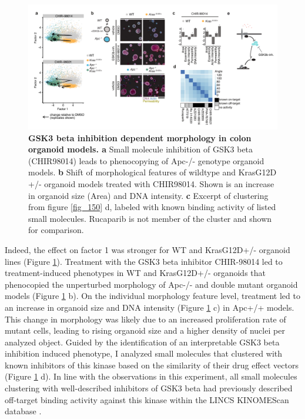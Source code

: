 \begin{flushleft}
\begin{figure}[h]
\centering
\includegraphics[scale=0.75,
                keepaspectratio]{figures/adenomaprofiling/pdf/fig_2_4_1.pdf}
\caption[GSK3 beta inhibition dependent morphology in colon organoid models]{\textbf{GSK3 beta inhibition dependent morphology in colon organoid models. a} Small molecule inhibition of GSK3 beta (CHIR98014) leads to phenocopying of Apc-/- genotype organoid models. \textbf{b} Shift of morphological features of wildtype and KrasG12D +/- organoid models treated with CHIR98014. Shown is an increase in organoid size (Area) and DNA intensity. \textbf{c} Excerpt of clustering from figure \ref{fig_150} d, labeled with known binding activity of listed small molecules. Rucaparib is not member of the cluster and shown for comparison.}
\label{fig_185}
\end{figure}
\bigbreak

Indeed, the effect on factor 1 was stronger for WT and KrasG12D+/- organoid lines (Figure \ref{fig_185}). Treatment with the GSK3 beta inhibitor CHIR-98014 led to treatment-induced phenotypes in WT and KrasG12D+/- organoids that phenocopied the unperturbed morphology of Apc-/- and double mutant organoid models (Figure \ref{fig_185} b). On the individual morphology feature level, treatment led to an increase in organoid size and DNA intensity (Figure \ref{fig_185} c) in Apc+/+ models. This change in morphology was likely due to an increased proliferation rate of mutant cells, leading to rising organoid size and a higher density of nuclei per analyzed object. Guided by the identification of an interpretable GSK3 beta inhibition induced phenotype, I analyzed small molecules that clustered with known inhibitors of this kinase based on the similarity of their drug effect vectors (Figure \ref{fig_185} d). In line with the observations in this experiment, all small molecules clustering with well-described inhibitors of GSK3 beta had previously described off-target binding activity against this kinase within the LINCS KINOMEScan database \citep{Duan2014-ku}. 
\par 


\end{flushleft}
